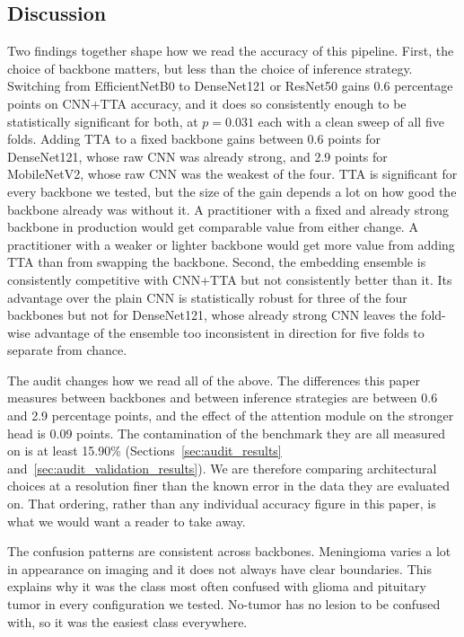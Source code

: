 \documentclass[11pt]{article}
\begin{document}
\subsection{Discussion}
\label{sec:discussion}

Two findings together shape how we read the accuracy of this pipeline. First, the choice of backbone matters, but less than the choice of inference strategy. Switching from EfficientNetB0 to DenseNet121 or ResNet50 gains 0.6 percentage points on CNN+TTA accuracy, and it does so consistently enough to be statistically significant for both, at $p=0.031$ each with a clean sweep of all five folds. Adding TTA to a fixed backbone gains between 0.6 points for DenseNet121, whose raw CNN was already strong, and 2.9 points for MobileNetV2, whose raw CNN was the weakest of the four. TTA is significant for every backbone we tested, but the size of the gain depends a lot on how good the backbone already was without it. A practitioner with a fixed and already strong backbone in production would get comparable value from either change. A practitioner with a weaker or lighter backbone would get more value from adding TTA than from swapping the backbone. Second, the embedding ensemble is consistently competitive with CNN+TTA but not consistently better than it. Its advantage over the plain CNN is statistically robust for three of the four backbones but not for DenseNet121, whose already strong CNN leaves the fold-wise advantage of the ensemble too inconsistent in direction for five folds to separate from chance.

The audit changes how we read all of the above. The differences this paper measures between backbones and between inference strategies are between 0.6 and 2.9 percentage points, and the effect of the attention module on the stronger head is 0.09 points. The contamination of the benchmark they are all measured on is at least 15.90\% (Sections~\ref{sec:audit_results} and~\ref{sec:audit_validation_results}). We are therefore comparing architectural choices at a resolution finer than the known error in the data they are evaluated on. That ordering, rather than any individual accuracy figure in this paper, is what we would want a reader to take away.

The confusion patterns are consistent across backbones. Meningioma varies a lot in appearance on imaging and it does not always have clear boundaries. This explains why it was the class most often confused with glioma and pituitary tumor in every configuration we tested. No-tumor has no lesion to be confused with, so it was the easiest class everywhere.
\end{document}
